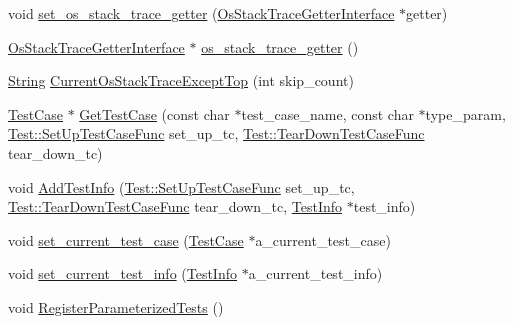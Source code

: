 \begin{DoxyCompactItemize}
\item 
void \hyperlink{classtesting_1_1internal_1_1UnitTestImpl_a965c4bc292baeaefc41238f86f36f67c}{set\-\_\-os\-\_\-stack\-\_\-trace\-\_\-getter} (\hyperlink{classtesting_1_1internal_1_1OsStackTraceGetterInterface}{\-Os\-Stack\-Trace\-Getter\-Interface} $\ast$getter)
\item 
\hyperlink{classtesting_1_1internal_1_1OsStackTraceGetterInterface}{\-Os\-Stack\-Trace\-Getter\-Interface} $\ast$ \hyperlink{classtesting_1_1internal_1_1UnitTestImpl_accb552ad4af910904a9e48c49c5c79a2}{os\-\_\-stack\-\_\-trace\-\_\-getter} ()
\item 
\hyperlink{classtesting_1_1internal_1_1String}{\-String} \hyperlink{classtesting_1_1internal_1_1UnitTestImpl_a131dbc639dae87df46e7f92daad7c183}{\-Current\-Os\-Stack\-Trace\-Except\-Top} (int skip\-\_\-count)
\item 
\hyperlink{classtesting_1_1TestCase}{\-Test\-Case} $\ast$ \hyperlink{classtesting_1_1internal_1_1UnitTestImpl_a6438a25b62877163bec864df1369909b}{\-Get\-Test\-Case} (const char $\ast$test\-\_\-case\-\_\-name, const char $\ast$type\-\_\-param, \hyperlink{classtesting_1_1Test_a2df065892efeff7ca91bb2d2fbe00975}{\-Test\-::\-Set\-Up\-Test\-Case\-Func} set\-\_\-up\-\_\-tc, \hyperlink{classtesting_1_1Test_a4ae7a4e140c70dee5c9cb82e13ae570c}{\-Test\-::\-Tear\-Down\-Test\-Case\-Func} tear\-\_\-down\-\_\-tc)
\item 
void \hyperlink{classtesting_1_1internal_1_1UnitTestImpl_a0f73735489a968e6f6d57f791a246615}{\-Add\-Test\-Info} (\hyperlink{classtesting_1_1Test_a2df065892efeff7ca91bb2d2fbe00975}{\-Test\-::\-Set\-Up\-Test\-Case\-Func} set\-\_\-up\-\_\-tc, \hyperlink{classtesting_1_1Test_a4ae7a4e140c70dee5c9cb82e13ae570c}{\-Test\-::\-Tear\-Down\-Test\-Case\-Func} tear\-\_\-down\-\_\-tc, \hyperlink{classtesting_1_1TestInfo}{\-Test\-Info} $\ast$test\-\_\-info)
\item 
void \hyperlink{classtesting_1_1internal_1_1UnitTestImpl_a0566e56597ac7b24d29d6545d82b5f3e}{set\-\_\-current\-\_\-test\-\_\-case} (\hyperlink{classtesting_1_1TestCase}{\-Test\-Case} $\ast$a\-\_\-current\-\_\-test\-\_\-case)
\item 
void \hyperlink{classtesting_1_1internal_1_1UnitTestImpl_a8bfd2a1906902da5fa95a75792883177}{set\-\_\-current\-\_\-test\-\_\-info} (\hyperlink{classtesting_1_1TestInfo}{\-Test\-Info} $\ast$a\-\_\-current\-\_\-test\-\_\-info)
\item 
void \hyperlink{classtesting_1_1internal_1_1UnitTestImpl_a42dd6cc650b930bbf73f665fbb13d515}{\-Register\-Parameterized\-Tests} ()

\end{DoxyCompactItemize}
